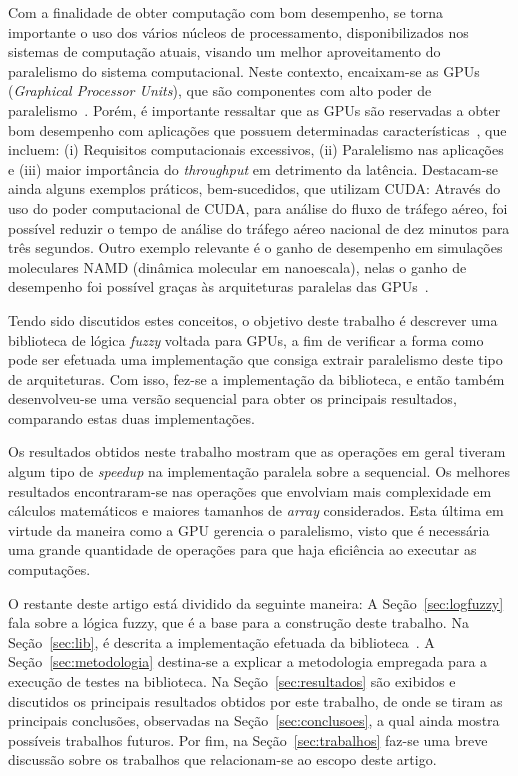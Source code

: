 \documentclass[12pt]{article}
\begin{document}

	Com a finalidade de obter computação com bom desempenho, se torna importante o uso dos vários núcleos de processamento, disponibilizados nos sistemas de computação atuais, visando um melhor aproveitamento do paralelismo do sistema computacional. Neste contexto, encaixam-se as GPUs (\textit{Graphical Processor Units}), que são componentes com alto poder de paralelismo~\cite{sengupta:07}. Porém, é importante ressaltar que as GPUs são reservadas a obter bom desempenho com aplicações que possuem determinadas características~\cite{owens:08}, que incluem: (i) Requisitos computacionais excessivos, (ii) Paralelismo nas aplicações e (iii) maior importância do \textit{throughput} em detrimento da latência. Destacam-se ainda alguns exemplos práticos, bem-sucedidos, que utilizam CUDA:
Através do uso do poder computacional de CUDA, para análise do fluxo de tráfego aéreo, foi possível reduzir o tempo de análise do tráfego aéreo nacional de dez minutos para três segundos. Outro exemplo relevante é o ganho de desempenho em simulações moleculares NAMD (dinâmica molecular em nanoescala), nelas o ganho de desempenho foi possível graças às arquiteturas paralelas das GPUs~\cite{nvidia:15}.

	Tendo sido discutidos estes conceitos, o objetivo deste trabalho é descrever uma biblioteca de lógica \textit{fuzzy} voltada para GPUs, a fim de verificar a forma como pode ser efetuada uma implementação que consiga extrair paralelismo deste tipo de arquiteturas. Com isso, fez-se a implementação da biblioteca, e então também desenvolveu-se uma versão sequencial para obter os principais resultados, comparando estas duas implementações.
	
	Os resultados obtidos neste trabalho mostram que as operações em geral tiveram algum tipo de \textit{speedup} na implementação paralela sobre a sequencial. Os melhores resultados encontraram-se nas operações que envolviam mais complexidade em cálculos matemáticos e maiores tamanhos de \textit{array} considerados. Esta última em virtude da maneira como a GPU gerencia o paralelismo, visto que é necessária uma grande quantidade de operações para que haja eficiência ao executar as computações.
	
	O restante deste artigo está dividido da seguinte maneira: A Seção~\ref{sec:logfuzzy} fala sobre a lógica fuzzy, que é a base para a construção deste trabalho. Na Seção~\ref{sec:lib}, é descrita a implementação efetuada da biblioteca~\libname. A Seção~\ref{sec:metodologia} destina-se a explicar a metodologia empregada para a execução de testes na biblioteca. Na Seção~\ref{sec:resultados} são exibidos e discutidos os principais resultados obtidos por este trabalho, de onde se tiram as principais conclusões, observadas na Seção~\ref{sec:conclusoes}, a qual ainda mostra possíveis trabalhos futuros. Por fim, na Seção~\ref{sec:trabalhos} faz-se uma breve discussão sobre os trabalhos que relacionam-se ao escopo deste artigo.
\end{document}
